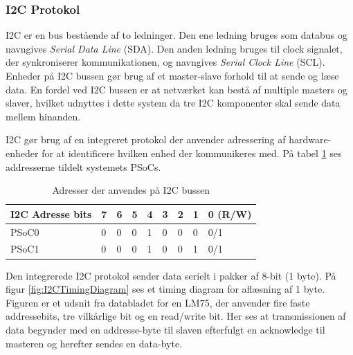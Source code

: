 \subsubsection{I2C Protokol}
\label{afsnit:I2CProtokol}

I2C\cite{I2C} er en bus bestående af to ledninger. Den ene ledning bruges som databus og navngives \textit{Serial Data Line} (SDA). Den anden ledning bruges til clock signalet, der synkroniserer kommunikationen, og navngives \textit{Serial Clock Line} (SCL). Enheder på I2C bussen gør brug af et master-slave forhold til at sende og læse data. En fordel ved I2C bussen er at netværket kan bestå af multiple masters og slaver, hvilket udnyttes i dette system da tre I2C komponenter skal sende data mellem hinanden.

I2C gør brug af en integreret protokol der anvender adressering af hardware-enheder for at identificere hvilken enhed der kommunikeres med. På tabel \ref{table:I2CAddress} ses addresserne tildelt systemets PSoCs.

\begin{table}[H]
	\centering
	\begin{tabular}{lllllllll}
		\hline
		\multicolumn{1}{|l|}{I2C Adresse bits} & 7                        & 6                        & 5                        & 4 & 3 & 2 & \multicolumn{1}{l|}{1} & \multicolumn{1}{l|}{0 (R/W)} \\ \hline
		\rowcolor[HTML]{CBCEFB} 
		{\color[HTML]{000000} PSoC0}           & {\color[HTML]{000000} 0} & {\color[HTML]{000000} 0} & {\color[HTML]{000000} 0} & 1 & 0 & 0 & 0                      & 0/1                          \\
		PSoC1                                  & 0                        & 0                        & 0                        & 1 & 0 & 0 & 1                      & 0/1                         
	\end{tabular}
	\caption{Adresser der anvendes på I2C bussen}
	\label{table:I2CAddress}
\end{table}

Den integrerede I2C protokol sender data serielt i pakker af 8-bit (1 byte). På figur \ref{fig:I2CTimingDiagram} ses et timing diagram for aflæsning af 1 byte. Figuren er et udsnit fra databladet for en LM75, der anvender fire faste addressebits, tre vilkårlige bit og en read/write bit. Her ses at transmissionen af data begynder med en addresse-byte til slaven efterfulgt en acknowledge til masteren og herefter sendes en data-byte. 

